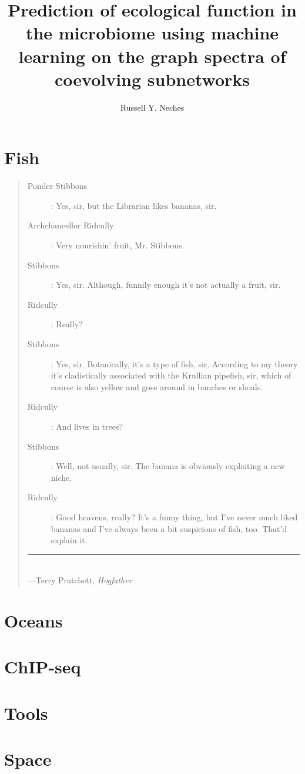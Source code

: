 \documentclass[PhD]{ucdavisthesis}
\title{Prediction of ecological function in the microbiome using machine learning on the graph spectra of coevolving subnetworks}
\author{Russell Y. Neches}
\begin{document}
\makeintropages

%

\begin{refsection}
\newrefsection

\end{refsection}

\part{Fish}

\begin{quote}
\begin{description}
\item[\sc Ponder Stibbons] : Yes, sir, but the Librarian likes bananas, sir.
\item[\sc Archchancellor Ridcully] : Very nourishin' fruit, Mr. Stibbons.
\item[\sc Stibbons] : Yes, sir. Although, funnily enough it's not actually a fruit, sir.
\item[\sc Ridcully] : Really?
\item[\sc Stibbons] : Yes, sir. Botanically, it's a type of fish, sir. According to my theory it's cladistically associated with the Krullian pipefish, sir, which of course is also yellow and goes around in bunches or shoals.
\item[\sc Ridcully] : And lives in trees?
\item[\sc Stibbons] : Well, not usually, sir. The banana is obviously exploiting a new niche.
\item[\sc Ridcully] : Good heavens, really? It's a funny thing, but I've never much liked bananas and I've always been a bit suspicious of fish, too. That'd explain it.
\end{description}
\rule{0.8\textwidth}{.4pt}\\
\hspace*{\fill}---Terry Pratchett, {\em Hogfather}
\end{quote}

\clearpage





\part{Oceans}





\part{ChIP-seq}




\part{Tools}




\part{Space}



\end{document}
